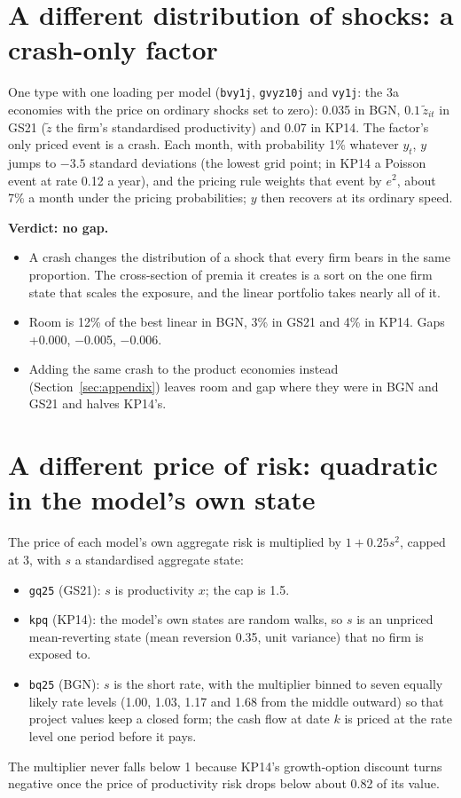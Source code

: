 \documentclass[11pt]{article}
\begin{document}
\section{A different distribution of shocks: a crash-only factor}

One type with one loading per model (\texttt{bvy1j}, \texttt{gvyz10j} and \texttt{vy1j}: the 3a economies with the price on ordinary shocks set to zero): 0.035 in BGN, $0.1\,\tilde z_{it}$ in GS21 ($\tilde z$ the firm's standardised productivity) and 0.07 in KP14. The factor's only priced event is a crash. Each month, with probability 1\% whatever $y_t$, $y$ jumps to $-3.5$ standard deviations (the lowest grid point; in KP14 a Poisson event at rate 0.12 a year), and the pricing rule weights that event by $e^2$, about 7\% a month under the pricing probabilities; $y$ then recovers at its ordinary speed.



\textbf{Verdict: no gap.}

\begin{itemize}
\item A crash changes the distribution of a shock that every firm bears in the same proportion. The cross-section of premia it creates is a sort on the one firm state that scales the exposure, and the linear portfolio takes nearly all of it.
\item Room is 12\% of the best linear in BGN, 3\% in GS21 and 4\% in KP14. Gaps +0.000, $-$0.005, $-$0.006.
\item Adding the same crash to the product economies instead (Section~\ref{sec:appendix}) leaves room and gap where they were in BGN and GS21 and halves KP14's.
\end{itemize}
\section{A different price of risk: quadratic in the model's own state}

The price of each model's own aggregate risk is multiplied by $1 + 0.25 s^2$, capped at 3, with $s$ a standardised aggregate state:

\begin{itemize}
\item \texttt{gq25} (GS21): $s$ is productivity $x$; the cap is 1.5.
\item \texttt{kpq} (KP14): the model's own states are random walks, so $s$ is an unpriced mean-reverting state (mean reversion 0.35, unit variance) that no firm is exposed to.
\item \texttt{bq25} (BGN): $s$ is the short rate, with the multiplier binned to seven equally likely rate levels (1.00, 1.03, 1.17 and 1.68 from the middle outward) so that project values keep a closed form; the cash flow at date $k$ is priced at the rate level one period before it pays.
\end{itemize}
The multiplier never falls below 1 because KP14's growth-option discount turns negative once the price of productivity risk drops below about 0.82 of its value.
\end{document}
